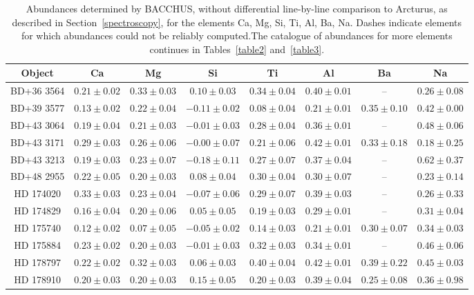 \begin{table*}
\caption{Abundances determined by BACCHUS, without differential line-by-line comparison to Arcturus, as described in Section~\ref{spectroscopy}, for the elements Ca, Mg, Si, Ti, Al, Ba, Na. Dashes indicate elements for which abundances could not be reliably computed.The catalogue of abundances for more elements continues in Tables~\ref{table2} and~\ref{table3}.\label{table1}}
\begin{tabular}{cccccccc}
\hline \hline
Object & Ca & Mg & Si & Ti & Al & Ba & Na \\
\hline
BD+36 3564 & $0.21 \pm 0.02$ & $0.33 \pm 0.03$ & $0.10 \pm 0.03$ & $0.34 \pm 0.04$ & $0.40 \pm 0.01$ & -- & $0.26 \pm 0.08$ \\
BD+39 3577 & $0.13 \pm 0.02$ & $0.22 \pm 0.04$ & $-0.11 \pm 0.02$ & $0.08 \pm 0.04$ & $0.21 \pm 0.01$ & $0.35 \pm 0.10$ & $0.42 \pm 0.00$ \\
BD+43 3064 & $0.19 \pm 0.04$ & $0.21 \pm 0.03$ & $-0.01 \pm 0.03$ & $0.28 \pm 0.04$ & $0.36 \pm 0.01$ & -- & $0.48 \pm 0.06$ \\
BD+43 3171 & $0.29 \pm 0.03$ & $0.26 \pm 0.06$ & $-0.00 \pm 0.07$ & $0.21 \pm 0.06$ & $0.42 \pm 0.01$ & $0.33 \pm 0.18$ & $0.18 \pm 0.25$ \\
BD+43 3213 & $0.19 \pm 0.03$ & $0.23 \pm 0.07$ & $-0.18 \pm 0.11$ & $0.27 \pm 0.07$ & $0.37 \pm 0.04$ & -- & $0.62 \pm 0.37$ \\
BD+48 2955 & $0.22 \pm 0.05$ & $0.20 \pm 0.03$ & $0.08 \pm 0.04$ & $0.30 \pm 0.04$ & $0.30 \pm 0.07$ & -- & $0.23 \pm 0.14$ \\
HD 174020 & $0.33 \pm 0.03$ & $0.23 \pm 0.04$ & $-0.07 \pm 0.06$ & $0.29 \pm 0.07$ & $0.39 \pm 0.03$ & -- & $0.26 \pm 0.33$ \\
HD 174829 & $0.16 \pm 0.04$ & $0.20 \pm 0.06$ & $0.05 \pm 0.05$ & $0.19 \pm 0.03$ & $0.29 \pm 0.01$ & -- & $0.31 \pm 0.04$ \\
HD 175740 & $0.12 \pm 0.02$ & $0.07 \pm 0.05$ & $-0.05 \pm 0.02$ & $0.14 \pm 0.03$ & $0.21 \pm 0.01$ & $0.30 \pm 0.07$ & $0.34 \pm 0.03$ \\
HD 175884 & $0.23 \pm 0.02$ & $0.20 \pm 0.03$ & $-0.01 \pm 0.03$ & $0.32 \pm 0.03$ & $0.34 \pm 0.01$ & -- & $0.46 \pm 0.06$ \\
HD 178797 & $0.22 \pm 0.02$ & $0.32 \pm 0.03$ & $0.06 \pm 0.03$ & $0.40 \pm 0.04$ & $0.42 \pm 0.01$ & $0.39 \pm 0.22$ & $0.45 \pm 0.03$ \\
HD 178910 & $0.20 \pm 0.03$ & $0.20 \pm 0.03$ & $0.15 \pm 0.05$ & $0.20 \pm 0.03$ & $0.39 \pm 0.04$ & $0.25 \pm 0.08$ & $0.36 \pm 0.98$ \\

\end{tabular}
\end{table*}
